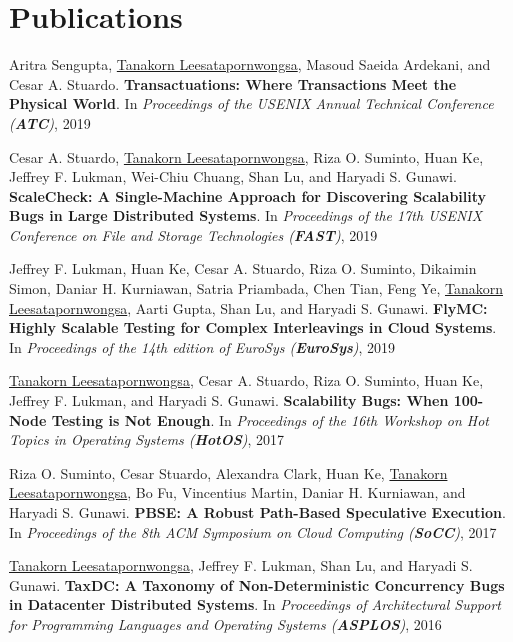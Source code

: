 \documentclass[10pt]{article} %
\begin{document}

\section{Publications}

Aritra Sengupta, \underline{Tanakorn Leesatapornwongsa}, Masoud Saeida
Ardekani, and Cesar A. Stuardo. \textbf{Transactuations: Where Transactions Meet 
the Physical World}. In \textit{Proceedings of the USENIX Annual 
Technical Conference (\textbf{ATC})}, 2019
\vspace{2mm}

Cesar A. Stuardo, \underline{Tanakorn Leesatapornwongsa}, Riza O. Suminto, Huan
Ke, Jeffrey F. Lukman, Wei-Chiu Chuang, Shan Lu, and Haryadi S. Gunawi.
\textbf{ScaleCheck: A Single-Machine Approach for Discovering Scalability Bugs
in Large Distributed Systems}. In \textit{Proceedings of the 17th
USENIX Conference on File and Storage Technologies (\textbf{FAST})}, 2019
\vspace{2mm}

Jeffrey F. Lukman, Huan Ke, Cesar A. Stuardo, Riza O. Suminto, Dikaimin Simon,
Daniar H. Kurniawan, Satria Priambada, Chen Tian, Feng Ye, \underline{Tanakorn
Leesatapornwongsa}, Aarti Gupta, Shan Lu, and Haryadi S. Gunawi. \textbf{FlyMC:
Highly Scalable Testing for Complex Interleavings in Cloud Systems}. In 
\textit{Proceedings of the 14th edition of EuroSys
(\textbf{EuroSys})}, 2019 
\vspace{2mm}

\underline{Tanakorn Leesatapornwongsa}, Cesar A. Stuardo, Riza O. Suminto, Huan Ke, 
Jeffrey F. Lukman, and Haryadi S. Gunawi. \textbf{Scalability Bugs: When 100-Node
Testing is Not Enough}. In \textit{Proceedings of the 16th Workshop on Hot Topics
in Operating Systems (\textbf{HotOS})}, 2017 
\vspace{2mm}

Riza O. Suminto, Cesar Stuardo, Alexandra Clark, Huan Ke, \underline{Tanakorn
Leesatapornwongsa}, Bo Fu, Vincentius Martin, Daniar H. Kurniawan, and Haryadi
S. Gunawi. \textbf{PBSE: A Robust Path-Based Speculative Execution}. In
\textit{Proceedings of the 8th ACM Symposium on Cloud Computing
(\textbf{SoCC})}, 2017
\vspace{2mm}

\underline{Tanakorn Leesatapornwongsa}, Jeffrey F. Lukman, Shan Lu, and Haryadi
S. Gunawi. \textbf{TaxDC: A Taxonomy of Non-Deterministic Concurrency Bugs in Datacenter
Distributed Systems}. In \textit{Proceedings of Architectural Support for
Programming Languages and Operating Systems (\textbf{ASPLOS})}, 2016 
\vspace{2mm}
\end{document}
